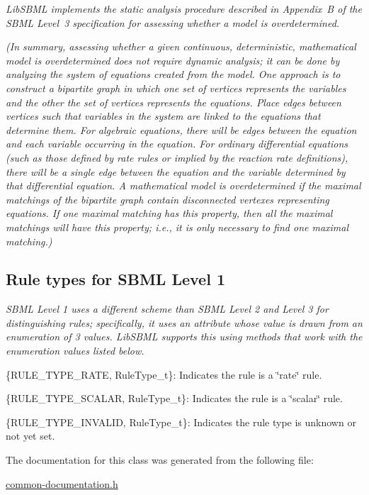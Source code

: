 {\itshape  Lib\+S\+B\+ML implements the static analysis procedure described in Appendix~B of the S\+B\+ML Level~3 specification for assessing whether a model is overdetermined.}

{\itshape  (In summary, assessing whether a given continuous, deterministic, mathematical model is overdetermined does not require dynamic analysis; it can be done by analyzing the system of equations created from the model. One approach is to construct a bipartite graph in which one set of vertices represents the variables and the other the set of vertices represents the equations. Place edges between vertices such that variables in the system are linked to the equations that determine them. For algebraic equations, there will be edges between the equation and each variable occurring in the equation. For ordinary differential equations (such as those defined by rate rules or implied by the reaction rate definitions), there will be a single edge between the equation and the variable determined by that differential equation. A mathematical model is overdetermined if the maximal matchings of the bipartite graph contain disconnected vertexes representing equations. If one maximal matching has this property, then all the maximal matchings will have this property; i.\+e., it is only necessary to find one maximal matching.)}

{\itshape }\hypertarget{classdoc__rules__general__summary_RuleType_t}{}\subsection{Rule types for S\+B\+M\+L Level 1}\label{classdoc__rules__general__summary_RuleType_t}
{\itshape  S\+B\+ML Level 1 uses a different scheme than S\+B\+ML Level 2 and Level 3 for distinguishing rules; specifically, it uses an attribute whose value is drawn from an enumeration of 3 values. Lib\+S\+B\+ML supports this using methods that work with the enumeration values listed below.}

{\itshape  \begin{DoxyItemize}
\item \{R\+U\+L\+E\+\_\+\+T\+Y\+P\+E\+\_\+\+R\+A\+TE, Rule\+Type\+\_\+t\}\+: Indicates the rule is a \char`\"{}rate\char`\"{} rule. \item \{R\+U\+L\+E\+\_\+\+T\+Y\+P\+E\+\_\+\+S\+C\+A\+L\+AR, Rule\+Type\+\_\+t\}\+: Indicates the rule is a \char`\"{}scalar\char`\"{} rule. \item \{R\+U\+L\+E\+\_\+\+T\+Y\+P\+E\+\_\+\+I\+N\+V\+A\+L\+ID, Rule\+Type\+\_\+t\}\+: Indicates the rule type is unknown or not yet set. \end{DoxyItemize}
}

The documentation for this class was generated from the following file\+:\begin{DoxyCompactItemize}
\item 
\hyperlink{common-documentation_8h}{common-\/documentation.\+h}\end{DoxyCompactItemize}
